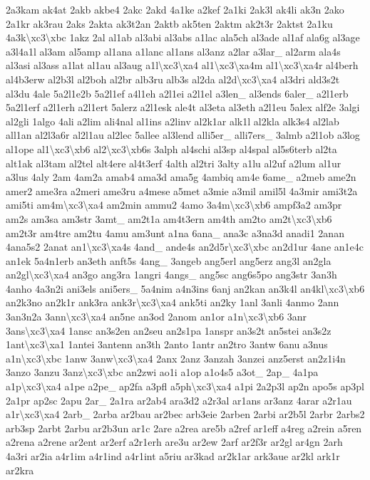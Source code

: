 \begin{DoxyCompactItemize}
2a3kam ak4at 2akb akbe4 2akc 2akd 4a1ke a2kef 2a1ki 2ak3l ak4li ak3n 2ako 2a1kr ak3rau 2aks 2akta ak3t2an 2aktb ak5ten 2aktm ak2t3r 2aktst 2a1ku 4a3k\textbackslash{}xc3\textbackslash{}xbc 1akz 2al al1ab al3abi al3abs a1lac ala5ch al3ade al1af ala6g al3age a3l4a1l al3am al5amp al1ana a1lanc al1ans al3anz a2lar a3lar\-\_\- al2arm ala4s al3asi al3ass a1lat al1au al3aug a1l\textbackslash{}xc3\textbackslash{}xa4 al1\textbackslash{}xc3\textbackslash{}xa4m al1\textbackslash{}xc3\textbackslash{}xa4r al4berh al4b3erw al2b3l al2boh al2br alb3ru alb3s al2da al2d\textbackslash{}xc3\textbackslash{}xa4 al3dri ald3s2t al3du 4ale 5a2l1e2b 5a2l1ef a4l1eh a2l1ei a2l1el a3len\-\_\- al3ends 6aler\-\_\- a2l1erb 5a2l1erf a2l1erh a2l1ert 5alerz a2l1esk ale4t al3eta al3eth a2l1eu 5alex alf2e 3algi al2gli 1algo 4ali a2lim ali4nal al1ins a2linv al2k1ar alk1l al2kla alk3s4 al2lab all1an al2l3a6r al2l1au al2lec 5allee al3lend alli5er\-\_\- alli7ers\-\_\- 3almb a2l1ob a3log al1ope al1\textbackslash{}xc3\textbackslash{}xb6 al2\textbackslash{}xc3\textbackslash{}xb6s 3alph al4schi al3sp al4spal al5s6terb al2ta alt1ak al3tam al2tel alt4ere al4t3erf 4alth al2tri 3alty a1lu al2uf a2lum al1ur a3lus 4aly 2am 4am2a amab4 ama3d ama5g 4ambiq am4e 6ame\-\_\- a2meb ame2n amer2 ame3ra a2meri ame3ru a4mese a5met a3mie a3mil amil5l 4a3mir ami3t2a ami5ti am4m\textbackslash{}xc3\textbackslash{}xa4 am2min ammu2 4amo 3a4m\textbackslash{}xc3\textbackslash{}xb6 ampf3a2 am3pr am2s am3sa am3str 3amt\-\_\- am2t1a am4t3ern am4th am2to am2t\textbackslash{}xc3\textbackslash{}xb6 am2t3r am4tre am2tu 4amu am3unt a1na 6ana\-\_\- ana3c a3na3d anadi1 2anan 4ana5s2 2anat an1\textbackslash{}xc3\textbackslash{}xa4s 4and\-\_\- ande4s an2d5r\textbackslash{}xc3\textbackslash{}xbc an2d1ur 4ane an1e4c an1ek 5a4n1erb an3eth anft5s 4ang\-\_\- 3angeb ang5erl ang5erz ang3l an2gla an2gl\textbackslash{}xc3\textbackslash{}xa4 an3go ang3ra 1angri 4angs\-\_\- ang5sc ang6s5po ang3str 3an3h 4anho 4a3n2i ani3els ani5ers\-\_\- 5a4nim a4n3ins 6anj an2kan an3k4l an4kl\textbackslash{}xc3\textbackslash{}xb6 an2k3no an2k1r ank3ra ank3r\textbackslash{}xc3\textbackslash{}xa4 ank5ti an2ky 1anl 3anli 4anmo 2ann 3an3n2a 3ann\textbackslash{}xc3\textbackslash{}xa4 an5ne an3od 2anom an1or a1n\textbackslash{}xc3\textbackslash{}xb6 3anr 3ans\textbackslash{}xc3\textbackslash{}xa4 1ansc an3s2en an2seu an2s1pa 1anspr an3s2t an5stei an3s2z 1ant\textbackslash{}xc3\textbackslash{}xa1 1antei 3antenn an3th 2anto 1antr an2tro 3antw 6anu a3nus a1n\textbackslash{}xc3\textbackslash{}xbc 1anw 3anw\textbackslash{}xc3\textbackslash{}xa4 2anx 2anz 3anzah 3anzei anz5erst an2z1i4n 3anzo 3anzu 3anz\textbackslash{}xc3\textbackslash{}xbc an2zwi ao1i a1op a1o4s5 a3ot\-\_\- 2ap\-\_\- 4a1pa a1p\textbackslash{}xc3\textbackslash{}xa4 a1pe a2pe\-\_\- ap2fa a3pfl a5ph\textbackslash{}xc3\textbackslash{}xa4 a1pi 2a2p3l ap2n apo5s ap3pl 2a1pr ap2sc 2apu 2ar\-\_\- 2a1ra ar2ab4 ara3d2 a2r3al ar1ans ar3anz 4arar a2r1au a1r\textbackslash{}xc3\textbackslash{}xa4 2arb\-\_\- 2arba ar2bau ar2bec arb3eie 2arben 2arbi ar2b5l 2arbr 2arbs2 arb3sp 2arbt 2arbu ar2b3un ar1c 2are a2rea are5b a2ref ar1eff a4reg a2rein a5ren a2rena a2rene ar2ent ar2erf a2r1erh are3u ar2ew 2arf ar2f3r ar2gl ar4gn 2arh 4a3ri ar2ia a4r1im a4r1ind a4r1int a5riu ar3kad ar2k1ar ark3aue ar2kl ark1r ar2kra 
\end{DoxyCompactItemize}
